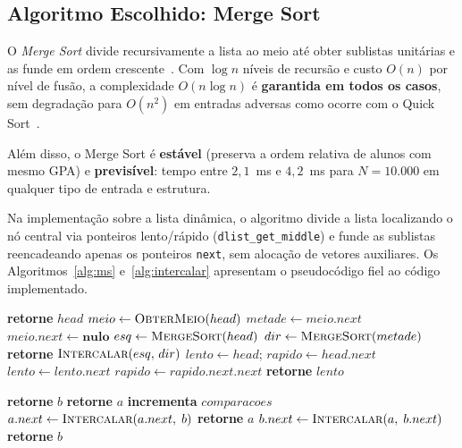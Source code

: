 \documentclass[conference]{IEEEtran}
\begin{document}
\subsection{Algoritmo Escolhido: Merge Sort}

O \textit{Merge Sort} divide recursivamente a lista ao meio até obter
sublistas unitárias e as funde em ordem crescente~\cite{cormen2022}.
Com $\log n$ níveis de recursão e custo $O(n)$ por nível de fusão,
a complexidade $O(n \log n)$ é \textbf{garantida em todos os casos},
sem degradação para $O(n^{2})$ em entradas adversas como ocorre com
o Quick Sort~\cite{sedgewick2011}.

Além disso, o Merge Sort é \textbf{estável} (preserva a ordem relativa
de alunos com mesmo GPA) e \textbf{previsível}: tempo entre $2{,}1$~ms
e $4{,}2$~ms para $N = 10{.}000$ em qualquer tipo de entrada e estrutura.

Na implementação sobre a lista dinâmica, o algoritmo divide a lista
localizando o nó central via ponteiros lento/rápido (\texttt{dlist\_get\_middle})
e funde as sublistas reencadeando apenas os ponteiros \texttt{next},
sem alocação de vetores auxiliares. Os Algoritmos~\ref{alg:ms}
e~\ref{alg:intercalar} apresentam o pseudocódigo fiel ao código
implementado.

\begin{algorithm}[tbp]
\caption{\textsc{MergeSort} em lista dinâmica}
\label{alg:ms}
\begin{algorithmic}[1]
    \State \textbf{retorne} $head$
  \EndIf
  \State $meio \gets \Call{ObterMeio}{head}$
  \State $metade \gets meio.next$
  \State $meio.next \gets \textbf{nulo}$
  \State $esq \gets \Call{MergeSort}{head}$
  \State $dir \gets \Call{MergeSort}{metade}$
  \State \textbf{retorne} $\Call{Intercalar}{esq,\, dir}$
\EndProcedure
\Statex
{}
  \State $lento \gets head$;\; $rapido \gets head.next$
    \State $lento \gets lento.next$
    \State $rapido \gets rapido.next.next$
  \EndWhile
  \State \textbf{retorne} $lento$
\EndProcedure
\end{algorithmic}
\end{algorithm}

\begin{algorithm}[tbp]
\caption{\textsc{Intercalar} duas sublistas ordenadas}
\label{alg:intercalar}
\begin{algorithmic}[1]
   \textbf{retorne} $b$ \EndIf
   \textbf{retorne} $a$ \EndIf
  \State \textbf{incrementa} $comparacoes$
    \State $a.next \gets \Call{Intercalar}{a.next,\; b}$
    \State \textbf{retorne} $a$
  \Else
    \State $b.next \gets \Call{Intercalar}{a,\; b.next}$
    \State \textbf{retorne} $b$
  \EndIf
\EndProcedure
\end{algorithmic}
\end{algorithm}
\end{document}

